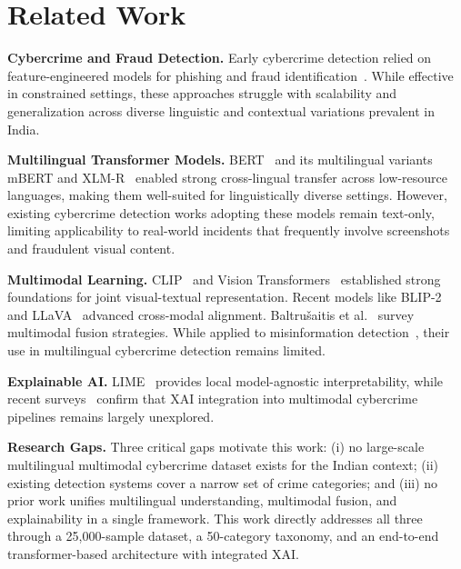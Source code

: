 \section{Related Work}

\noindent\textbf{Cybercrime and Fraud Detection.}
Early cybercrime detection relied on feature-engineered models for phishing and fraud 
identification~\cite{cybercrime2020}. While effective in constrained settings, these 
approaches struggle with scalability and generalization across diverse linguistic and 
contextual variations prevalent in India.

\noindent\textbf{Multilingual Transformer Models.}
BERT~\cite{bert2019} and its multilingual variants mBERT and XLM-R~\cite{xlmr2020} 
enabled strong cross-lingual transfer across low-resource languages, making them 
well-suited for linguistically diverse settings. However, existing cybercrime detection 
works adopting these models remain text-only, limiting applicability to real-world 
incidents that frequently involve screenshots and fraudulent visual content.

\noindent\textbf{Multimodal Learning.}
CLIP~\cite{clip2021} and Vision Transformers~\cite{vit2021} established strong
foundations for joint visual-textual representation. Recent models like
BLIP-2~\cite{blip2_2023} and LLaVA~\cite{llava2023} advanced cross-modal
alignment. Baltru\v{s}aitis et al.~\cite{multimodal2019} survey multimodal
fusion strategies. While applied to misinformation detection~\cite{fake_news_2025},
their use in multilingual cybercrime detection remains limited.

\noindent\textbf{Explainable AI.}
LIME~\cite{lime2016} provides local model-agnostic interpretability, while
recent surveys~\cite{xai_transformer2025, vit_xai2024, vlm_survey2024} confirm
that XAI integration into multimodal cybercrime pipelines remains largely unexplored.

\noindent\textbf{Research Gaps.}
Three critical gaps motivate this work: (i) no large-scale multilingual multimodal 
cybercrime dataset exists for the Indian context; (ii) existing detection systems 
cover a narrow set of crime categories; and (iii) no prior work unifies multilingual 
understanding, multimodal fusion, and explainability in a single framework. This work 
directly addresses all three through a 25,000-sample dataset, a 50-category taxonomy, 
and an end-to-end transformer-based architecture with integrated XAI.